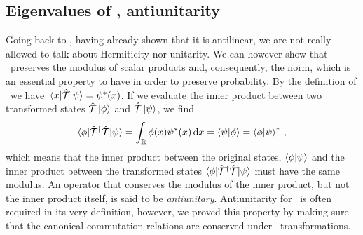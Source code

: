         \subsection{Eigenvalues of \hT, antiunitarity}
            Going back to \hT, having already shown that it is antilinear, we are not really allowed to talk about Hermiticity nor unitarity. We can however show that \hT\ preserves the modulus of scalar products and, consequently, the norm, which is an essential property to have in order to preserve probability. By the definition of \hT\ we have $\mel{x}{\hT}{\psi} = \psi^*\pqty{x}$. If we evaluate the inner product between two transformed states $\mathcal{\hat{T}}\ket{\phi}$ and $\mathcal{\hat{T}}\ket{\psi}$, we find
            \begin{equation*}
                \bra{\phi}\!\hT^\dag\hT\!\ket{\psi}
                = \int\nolimits_\bbR \phi\pqty{x}\psi^*\pqty{x}\dd{x}
                = \bra{\psi}\ket{\phi}
                = \bra{\phi}\ket{\psi}^*
                \mycomma
            \end{equation*}
            which means that the inner product between the original states, $\braket{\phi}{\psi}$ and the inner product between the transformed states $\bra{\phi}\!\mathcal{\hat{T}}^\dag\mathcal{\hat{T}}\!\ket{\psi}$ must have the same modulus. An operator that conserves the modulus of the inner product, but not the inner product itself, is said to be \emph{antiunitary}. Antiunitarity for \hT\ is often required in its very definition, however, we proved this property by making sure that the canonical commutation relations are conserved under \mcT\ transformations.
            
